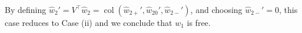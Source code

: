 \documentclass[11pt,print,draftcls,onecolumn,romanappendices]{ieeecolor}
\newtheorem{lem}[thm]{Lemma}
\DeclareMathOperator{\col}{col}
\newcommand{\LTI}[1]{\mathfrak{L}^{#1}}
\newcommand{\proj}[2]{\pi_{#1}\left(#2\right)}
\newcommand{\remind}[1]{{\color{black} #1}}
\newcommand{\B}{\mathfrak{B}}
\begin{document}
\noindent By defining $\hat{w}_2'=V^\top \hat{w}_2=\col(\hat{w}_{2+}',\hat{w}_{20}',\hat{w}_{2-}')$, and choosing $\hat{w}_{2-}'=0$, this case reduces to Case (ii) and we conclude that $w_1$ is free.
%
\end{document}
